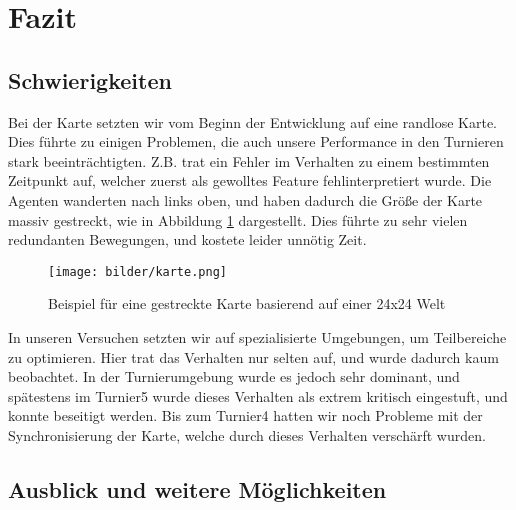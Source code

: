 \section{Fazit}

\subsection{Schwierigkeiten}

Bei der Karte setzten wir vom Beginn der Entwicklung auf eine randlose Karte. Dies führte zu einigen Problemen, die auch unsere Performance in den Turnieren stark beeinträchtigten. Z.B. trat ein Fehler im Verhalten zu einem bestimmten Zeitpunkt auf, welcher zuerst als gewolltes Feature fehlinterpretiert wurde. Die Agenten wanderten nach links oben, und haben dadurch die Größe der Karte massiv gestreckt, wie in Abbildung \ref{fig:kartenwiederholung} dargestellt. Dies führte zu sehr vielen redundanten Bewegungen, und kostete leider unnötig Zeit. \\

\begin{figure}
    \texttt{[image: bilder/karte.png]}
    \centering
    \caption{Beispiel für eine gestreckte Karte basierend auf einer 24x24 Welt }
    \label{fig:kartenwiederholung}
\end{figure}

In unseren Versuchen setzten wir auf spezialisierte Umgebungen, um Teilbereiche zu optimieren. Hier trat das Verhalten nur selten auf, und wurde dadurch kaum beobachtet. In der Turnierumgebung wurde es jedoch sehr dominant, und spätestens im Turnier5 wurde dieses Verhalten als extrem kritisch eingestuft, und konnte beseitigt werden. Bis zum Turnier4 hatten wir noch Probleme mit der Synchronisierung der Karte, welche durch dieses Verhalten verschärft wurden. \\


\subsection{Ausblick und weitere Möglichkeiten}